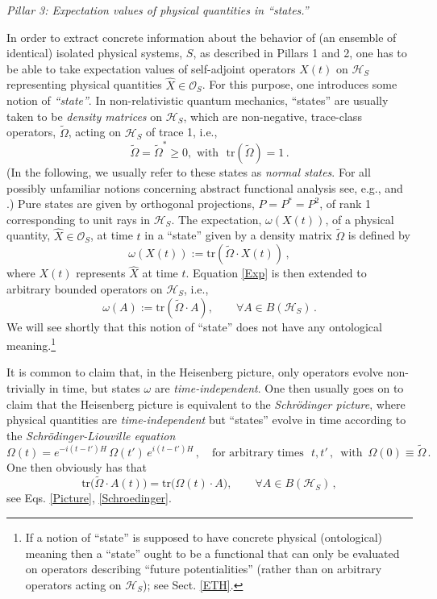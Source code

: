 \documentclass[12pt]{article}
\begin{document}
\textit{{Pillar 3}: Expectation values of physical quantities in ``states.''}

In order to extract concrete information about the behavior of (an ensemble of identical) isolated physical systems, $S$, 
as described in Pillars 1 and 2, one has to be able to take expectation values of self-adjoint operators $X(t)$ on 
$\mathcal{H}_S$ representing physical quantities $\hat{X} \in \mathcal{O}_S$. For this purpose, one introduces 
some notion of \textit{``state''}. In non-relativistic quantum mechanics, ``states'' are usually taken to be 
\textit{density matrices} on $\mathcal{H}_S$, which are non-negative, trace-class operators, $\widetilde{\Omega}$, 
acting on $\mathcal{H}_S$ of trace 1, i.e.,
\begin{equation}\label{density matrix}
\widetilde{\Omega} = \widetilde{\Omega}^{*} \geq 0,\,\,\text {with }\,\, \text{tr}(\widetilde{\Omega}) =1\,.
\end{equation}
(In the following, we usually refer to these states as \textit{normal states}. For all possibly unfamiliar notions concerning  abstract functional analysis see, e.g.,  \cite{Lanford} and \cite{Takesaki}.) Pure states are given by orthogonal projections, $P=P^{*}=P^{2}$, of rank 1 corresponding to unit rays in $\mathcal{H}_S$.
The expectation, $\omega(X(t))$, of a physical quantity, $\hat{X}\in \mathcal{O}_S$, at time $t$ in a ``state'' given by a density matrix $\widetilde{\Omega}$ is defined by
\begin{equation}\label{Exp}
\omega(X(t)):= \text{tr}(\widetilde{\Omega}\cdot X(t))\,, 
\end{equation}
where $X(t)$ represents $\hat{X}$ at time $t$. Equation \eqref{Exp} is then extended to arbitrary bounded operators on $\mathcal{H}_S$, i.e., 
$$\omega(A):= \text{tr}(\widetilde{\Omega}\cdot A), \qquad \forall A \in B(\mathcal{H}_S)\,.$$
We will see shortly that this notion of ``state'' does not have any ontological meaning.\footnote{If a notion of ``state'' is 
supposed to have concrete physical (ontological) meaning then a ``state'' ought to be a functional that can only be evaluated 
on operators describing ``future potentialities'' (rather than on arbitrary operators acting on $\mathcal{H}_S$); 
see Sect. \ref{ETH}.}

It is common to claim that, in the Heisenberg picture, only operators evolve non-trivially in time, but states $\omega$ are \textit{time-independent}. One then usually goes on to claim that the Heisenberg picture is equivalent to the \textit{Schr\"odinger picture}, where physical quantities are \textit{time-independent} but ``states'' evolve in time according to the \textit{Schr\"odinger-Liouville equation}
\begin{equation}\label{Schroedinger}
\Omega(t)= e^{-i(t-t')H} \,\Omega(t') \, e^{i(t-t')H}\,, \quad \text{for arbitrary times }\,\, t, t'\,, \, \text{ with }\, \Omega(0)\equiv \widetilde{\Omega}\,.
\end{equation}
One then obviously has that 
$$\text{tr}\big(\widetilde{\Omega}\cdot A(t)\big)= \text{tr}\big(\Omega(t)\cdot A\big), \qquad \forall A \in B(\mathcal{H}_S)\,,$$
see Eqs. \eqref{Picture}, \eqref{Schroedinger}.
\end{document}
